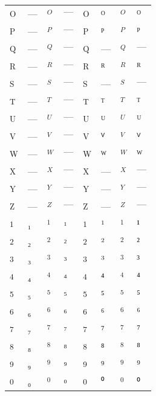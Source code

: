 \documentclass{standalone}
\begin{document}
\begin{tabular}{ll|ll|ll|ll}
\textsubscript{O} & — & $_{O}$ & $—$ & \textsuperscript{O} & ᴼ & $^{O}$ & $ᴼ$ \\
\textsubscript{P} & — & $_{P}$ & $—$ & \textsuperscript{P} & ᴾ & $^{P}$ & $ᴾ$ \\
\textsubscript{Q} & — & $_{Q}$ & $—$ & \textsuperscript{Q} & — & $^{Q}$ & $—$ \\
\textsubscript{R} & — & $_{R}$ & $—$ & \textsuperscript{R} & ᴿ & $^{R}$ & $ᴿ$ \\
\textsubscript{S} & — & $_{S}$ & $—$ & \textsuperscript{S} & — & $^{S}$ & $—$ \\
\textsubscript{T} & — & $_{T}$ & $—$ & \textsuperscript{T} & ᵀ & $^{T}$ & $ᵀ$ \\
\textsubscript{U} & — & $_{U}$ & $—$ & \textsuperscript{U} & ᵁ & $^{U}$ & $ᵁ$ \\
\textsubscript{V} & — & $_{V}$ & $—$ & \textsuperscript{V} & ⱽ & $^{V}$ & $ⱽ$ \\
\textsubscript{W} & — & $_{W}$ & $—$ & \textsuperscript{W} & ᵂ & $^{W}$ & $ᵂ$ \\
\textsubscript{X} & — & $_{X}$ & $—$ & \textsuperscript{X} & — & $^{X}$ & $—$ \\
\textsubscript{Y} & — & $_{Y}$ & $—$ & \textsuperscript{Y} & — & $^{Y}$ & $—$ \\
\textsubscript{Z} & — & $_{Z}$ & $—$ & \textsuperscript{Z} & — & $^{Z}$ & $—$ \\
\midrule
\textsubscript{1} & ₁ & $_{1}$ & $₁$ & \textsuperscript{1} & ¹ & $^{1}$ & $¹$ \\
\textsubscript{2} & ₂ & $_{2}$ & $₂$ & \textsuperscript{2} & ² & $^{2}$ & $²$ \\
\textsubscript{3} & ₃ & $_{3}$ & $₃$ & \textsuperscript{3} & ³ & $^{3}$ & $³$ \\
\textsubscript{4} & ₄ & $_{4}$ & $₄$ & \textsuperscript{4} & ⁴ & $^{4}$ & $⁴$ \\
\textsubscript{5} & ₅ & $_{5}$ & $₅$ & \textsuperscript{5} & ⁵ & $^{5}$ & $⁵$ \\
\textsubscript{6} & ₆ & $_{6}$ & $₆$ & \textsuperscript{6} & ⁶ & $^{6}$ & $⁶$ \\
\textsubscript{7} & ₇ & $_{7}$ & $₇$ & \textsuperscript{7} & ⁷ & $^{7}$ & $⁷$ \\
\textsubscript{8} & ₈ & $_{8}$ & $₈$ & \textsuperscript{8} & ⁸ & $^{8}$ & $⁸$ \\
\textsubscript{9} & ₉ & $_{9}$ & $₉$ & \textsuperscript{9} & ⁹ & $^{9}$ & $⁹$ \\
\textsubscript{0} & ₀ & $_{0}$ & $₀$ & \textsuperscript{0} & ⁰ & $^{0}$ & $⁰$ \\

\end{tabular}
\end{document}
